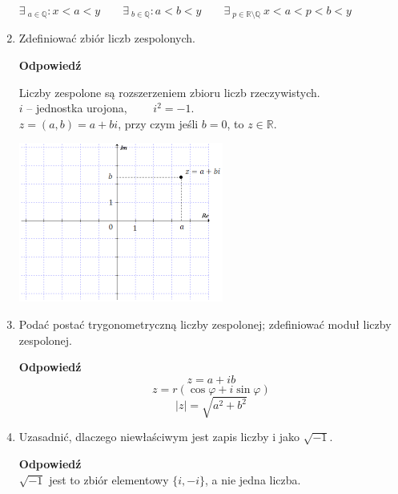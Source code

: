\documentclass[12pt,a4paper]{article}
\theoremstyle{break}
\newcommand{\Odp}[1]{
		\begin{mdframed}[style=zadanie]
			\textbf{Odpowiedź}\\
			#1
		\end{mdframed}
	}
\begin{document}
\begin{enumerate}[1.]
{		$\exists\:_{a\in \mathbb{Q}}: x<a<y \qquad \exists\:_{b\in\mathbb{Q}} : a<b<y 
		\qquad\exists\:_{p\in \mathbb{R}\setminus\mathbb{Q}}\: x<a<p<b<y$
	}
	
	\item Zdefiniować zbiór liczb zespolonych.
	\Odp{
			\noindent
			\begin{minipage}[t]{0.55\textwidth}
				\vspace{0pt}  %
				Liczby zespolone są rozszerzeniem zbioru liczb rzeczywistych.\\[0.5em]
				$i$ – jednostka urojona,  $\qquad i^2 = -1$.\\[0.5em]
				$z = (a, b) = a + bi$, przy czym jeśli $b = 0$, to $z \in \mathbb{R}$.\\[0.5em]
				
			\end{minipage}%
			\hfill
			\begin{minipage}[t]{0.4\textwidth}
				\vspace{0pt}  %
				\includegraphics[width=\linewidth]{uz.png}
			\end{minipage}
	}
	
	\item Podać postać trygonometryczną liczby zespolonej; zdefiniować moduł liczby zespolonej.
	\Odp{
		$$z=a+ib$$
		$$z=r(\cos\varphi + i\sin\varphi)$$
		$$|z|=\sqrt{a^2+b^2}$$
	}
	
	\item Uzasadnić, dlaczego niewłaściwym jest zapis liczby i jako $\sqrt{-1}$.
	\Odp{
		$\sqrt{-1}$  jest to zbiór elementowy $\{i,-i\}$, a nie jedna liczba.
	}
	

\end{enumerate}
\end{document}
